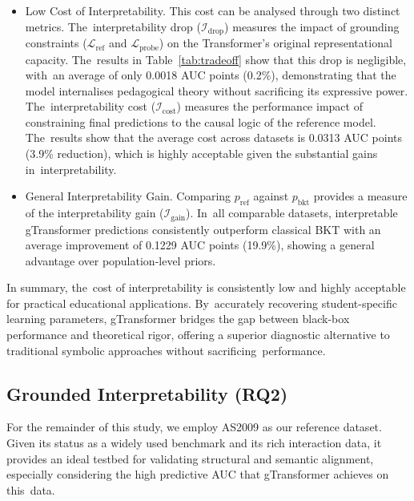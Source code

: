 \documentclass[applsci,article,accept,moreauthors,pdftex]{Definitions/mdpi}
\begin{document}
\begin{itemize}
    \item Low Cost of Interpretability. This cost can be analysed through two distinct metrics. The~interpretability drop ($\mathcal{I}_{\text{drop}}$) measures the impact of grounding constraints ($\mathcal{L}_{\text{ref}}$ and $\mathcal{L}_{\text{probe}}$) on the Transformer's original representational capacity. The~results in Table~\ref{tab:tradeoff} show that this drop is negligible, with~an average of only 0.0018 AUC points (0.2\%), demonstrating that the model internalises pedagogical theory without sacrificing its expressive power. The~interpretability cost ($\mathcal{I}_{\text{cost}}$) measures the performance impact of constraining final predictions to the causal logic of the reference model. The~results show that the average cost across datasets is 0.0313 AUC points (3.9\% reduction), which is highly acceptable given the substantial gains in~interpretability.
    
    \item General Interpretability Gain. Comparing $p_{\text{ref}}$ against $p_{\text{bkt}}$ provides a measure of the interpretability gain ($\mathcal{I}_{\text{gain}}$). In~all comparable datasets, interpretable gTransformer predictions consistently outperform classical BKT with an average improvement of 0.1229 AUC points (19.9\%), showing a general advantage over population-level priors. 
\end{itemize}

In summary, the~cost of interpretability is consistently low and highly acceptable for practical educational applications. By~accurately recovering student-specific learning parameters, gTransformer bridges the gap between black-box performance and theoretical rigor, offering a superior diagnostic alternative to traditional symbolic approaches without sacrificing~performance.


\subsection{Grounded Interpretability (RQ2)} \label{sec_grounded}

For the remainder of this study, we employ AS2009 as our reference dataset. Given its status as a widely used benchmark and its rich interaction data, it provides an ideal testbed for validating structural and semantic alignment, especially considering the high predictive AUC that gTransformer achieves on this~data.
\end{document}
